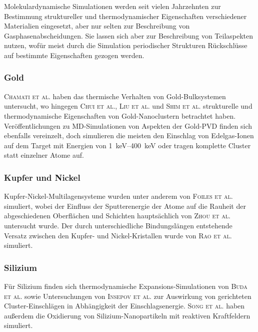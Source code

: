 Molekulardynamische Simulationen werden seit vielen Jahrzehnten zur Bestimmung struktureller und thermodynamischer Eigenschaften verschiedener Materialien eingesetzt, aber nur selten zur Beschreibung von Gasphasenabscheidungen.
Sie lassen sich aber zur Beschreibung von Teilaspekten nutzen, wofür meist durch die Simulation periodischer Strukturen Rückschlüsse auf bestimmte Eigenschaften gezogen werden.

\subsubsection{Gold}
\textsc{Chamati et al.}\cite{chamati_second-moment_2004} haben das thermische Verhalten von Gold-Bulksystemen untersucht, wo hingegen \textsc{Chui et al.}\cite{chui_molecular_2007}, \textsc{Liu et al.}\cite{liu_melting_2001} und \textsc{Shim et al.}\cite{shim_molecular_2003} strukturelle und thermodynamische Eigenschaften von Gold-Nanoclustern betrachtet haben.
Veröffentlichungen zu MD-Simulationen von Aspekten der Gold-PVD finden sich ebenfalls vereinzelt, doch simulieren die meisten den Einschlag von Edelgas-Ionen auf dem Target mit Energien von \SIrange{1}{400}{\kilo\electronvolt}\cite{insepov_molecular_1995,shapiro_simulation_1999} oder tragen komplette Cluster statt einzelner Atome auf\cite{inoue_molecular_2008}.

\subsubsection{Kupfer und Nickel}
Kupfer-Nickel-Multilagensysteme wurden unter anderem von \textsc{Foiles et al.}\cite{foiles_calculation_1985} simuliert, wobei der Einfluss der Sputterenergie der Atome auf die Rauheit der abgeschiedenen Oberflächen und Schichten hauptsächlich von \textsc{Zhou et al.}\cite{zhou_atomistic_1998} untersucht wurde.
Der durch unterschiedliche Bindungslängen entstehende Versatz zwischen den Kupfer- und Nickel-Kristallen wurde von \textsc{Rao et al.}\cite{rao_atomistic_2000} simuliert.

\subsubsection{Silizium}
Für Silizium finden sich thermodynamische Expansions-Simulationen von \textsc{Buda et al.}\cite{buda_thermal_1990} sowie Untersuchungen von \textsc{Insepov et al.}\cite{insepov_molecular_1995} zur Auswirkung von gerichteten Cluster-Einschlägen in Abhängigkeit der Einschlagsenergie.
\textsc{Song et al.}\cite{song_reactive_2012} haben außerdem die Oxidierung von Silizium-Nanopartikeln mit reaktiven Kraftfeldern simuliert.

